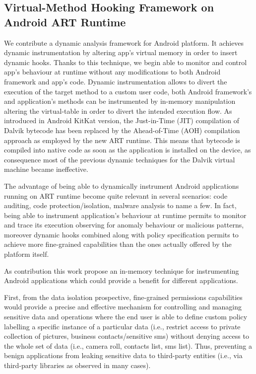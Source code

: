 \subsection{Virtual-Method Hooking Framework on Android ART Runtime}

We contribute a dynamic analysis framework for Android platform. It achieves dynamic instrumentation by altering app's virtual memory in order to insert dynamic hooks. Thanks to this technique, we begin able to monitor and control app's behaviour at runtime without any modifications to both Android framework and app's code. Dynamic instrumentation allows to divert the execution of the target method to a custom user code, both Android framework's and application's methods can be instrumented by in-memory manipulation altering the virtual-table in order to divert the intended execution flow. As introduced in Android KitKat version, the Just-in-Time (JIT) compilation of Dalvik bytecode has been replaced by the Ahead-of-Time (AOH) compilation approach as employed by the new ART runtime. This means that bytecode is compiled into native code as soon as the application is installed on the device, as consequence most of the previous dynamic techniques for the Dalvik virtual machine became ineffective.

The advantage of being able to dynamically instrument Android applications running on ART runtime become quite relevant in several scenarios: code auditing, code protection/isolation, malware analysis to name a few. In fact, being able to instrument application's behaviour at runtime permits to monitor and trace its execution observing for anomaly behaviour or malicious patterns, moreover dynamic hooks combined along with policy specification permits to achieve more fine-grained capabilities  than the ones actually offered by the platform itself.

As contribution this work propose an in-memory technique for instrumenting Android applications which could provide a benefit for different applications.

First, from the data isolation prospective, fine-grained permissions capabilities would provide a precise and effective mechanism for controlling and managing sensitive data and operations where the end user is able to define custom policy labelling a specific instance of a particular data (i.e., restrict access to private collection of pictures, business contacts/sensitive sms) without denying access to the whole set of data (i.e., camera roll, contacts list, sms list). Thus, preventing a benign applications from leaking sensitive data to third-party entities (i.e., via third-party libraries as observed in many cases).

